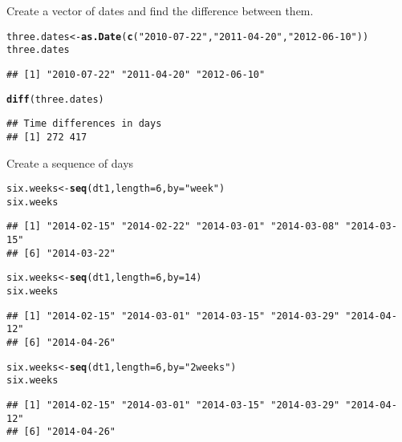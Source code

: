 \documentclass[12pt, a4paper, oneside]{article}\usepackage[]{graphicx}\usepackage[]{color}
\makeatletter
\newcommand{\hlnum}[1]{\textcolor[rgb]{0.686,0.059,0.569}{#1}}%
\newcommand{\hlstr}[1]{\textcolor[rgb]{0.192,0.494,0.8}{#1}}%
\newcommand{\hlstd}[1]{\textcolor[rgb]{0.345,0.345,0.345}{#1}}%
\newcommand{\hlkwb}[1]{\textcolor[rgb]{0.69,0.353,0.396}{#1}}%
\newcommand{\hlkwc}[1]{\textcolor[rgb]{0.333,0.667,0.333}{#1}}%
\newcommand{\hlkwd}[1]{\textcolor[rgb]{0.737,0.353,0.396}{\textbf{#1}}}%
\newenvironment{kframe}{%
 \def\at@end@of@kframe{}%
 \ifinner\ifhmode%
  \def\at@end@of@kframe{\end{minipage}}%
  \begin{minipage}{\columnwidth}%
 \fi\fi%
 \def\FrameCommand##1{\hskip\@totalleftmargin \hskip-\fboxsep
 \colorbox{shadecolor}{##1}\hskip-\fboxsep
     \hskip-\linewidth \hskip-\@totalleftmargin \hskip\columnwidth}%
 \MakeFramed {\advance\hsize-\width
   \@totalleftmargin\z@ \linewidth\hsize
   \@setminipage}}%
 {\par\unskip\endMakeFramed%
 \at@end@of@kframe}
\newenvironment{knitrout}{}{} %
\makeatother
\begin{document}
Create a vector of dates and find the difference between them. 
\begin{knitrout}
\color{fgcolor}\begin{kframe}
\begin{alltt}
\hlstd{three.dates} \hlkwb{<-} \hlkwd{as.Date}\hlstd{(}\hlkwd{c}\hlstd{(}\hlstr{"2010-07-22"}\hlstd{,} \hlstr{"2011-04-20"}\hlstd{,} \hlstr{"2012-06-10"}\hlstd{))}
\hlstd{three.dates}
\end{alltt}
\begin{verbatim}
## [1] "2010-07-22" "2011-04-20" "2012-06-10"
\end{verbatim}
\begin{alltt}
\hlkwd{diff}\hlstd{(three.dates)}
\end{alltt}
\begin{verbatim}
## Time differences in days
## [1] 272 417
\end{verbatim}
\end{kframe}
\end{knitrout}

Create a sequence of days
\begin{knitrout}
\color{fgcolor}\begin{kframe}
\begin{alltt}
\hlstd{six.weeks} \hlkwb{<-} \hlkwd{seq}\hlstd{(dt1,} \hlkwc{length} \hlstd{=} \hlnum{6}\hlstd{,} \hlkwc{by} \hlstd{=} \hlstr{"week"}\hlstd{)}
\hlstd{six.weeks}
\end{alltt}
\begin{verbatim}
## [1] "2014-02-15" "2014-02-22" "2014-03-01" "2014-03-08" "2014-03-15"
## [6] "2014-03-22"
\end{verbatim}
\begin{alltt}
\hlstd{six.weeks} \hlkwb{<-} \hlkwd{seq}\hlstd{(dt1,} \hlkwc{length} \hlstd{=} \hlnum{6}\hlstd{,} \hlkwc{by} \hlstd{=} \hlnum{14}\hlstd{)}
\hlstd{six.weeks}
\end{alltt}
\begin{verbatim}
## [1] "2014-02-15" "2014-03-01" "2014-03-15" "2014-03-29" "2014-04-12"
## [6] "2014-04-26"
\end{verbatim}
\begin{alltt}
\hlstd{six.weeks} \hlkwb{<-} \hlkwd{seq}\hlstd{(dt1,} \hlkwc{length} \hlstd{=} \hlnum{6}\hlstd{,} \hlkwc{by} \hlstd{=} \hlstr{"2 weeks"}\hlstd{)}
\hlstd{six.weeks}
\end{alltt}
\begin{verbatim}
## [1] "2014-02-15" "2014-03-01" "2014-03-15" "2014-03-29" "2014-04-12"
## [6] "2014-04-26"
\end{verbatim}
\end{kframe}
\end{knitrout}
\end{document}
